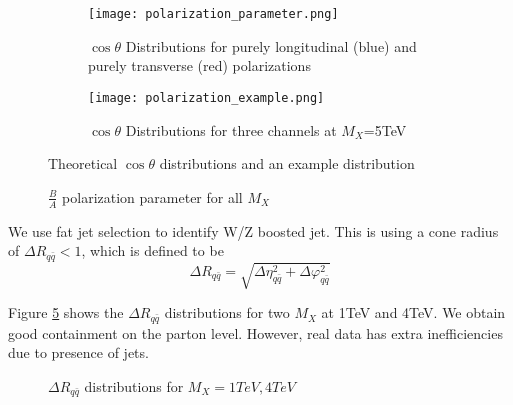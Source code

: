 \documentclass[12pt]{article}
\begin{document}
\begin{figure}
\centering
\begin{subfigure}{.4\textwidth}
  \centering
  \texttt{[image: polarization\_parameter.png]}
  \caption{$\cos\theta$ Distributions for purely longitudinal (blue) and purely transverse (red) polarizations}
  \label{polarization_parameter}
\end{subfigure}%
\begin{subfigure}{.6\textwidth}
  \centering
  \texttt{[image: polarization\_example.png]}
  \caption{$\cos\theta$ Distributions for three channels at $M_X$=5TeV}
  \label{polarization_example}
\end{subfigure}
\caption{Theoretical $\cos\theta$ distributions and an example distribution}
\label{qq_cuts}
\end{figure}

\begin{figure}[H]
\begin{center}
\caption[Caption for LOF]{$\frac{B}{A}$ polarization parameter for all $M_X$}
\label{ba}
\end{center}
\end{figure}
We use fat jet selection to identify W/Z boosted jet. This is using a cone radius of $\Delta R_{q\bar{q}}<1$, which is defined to be
\begin{equation}
\Delta R_{q\bar{q}}=\sqrt{\Delta\eta^2_{q\bar{q}}+\Delta\varphi^2_{q\bar{q}}}
\end{equation}


Figure \ref{delta_r} shows the $\Delta R_{q\bar{q}}$ distributions for two $M_X$ at 1TeV and 4TeV. We obtain good containment on the parton level. However, real data has extra inefficiencies due to presence of jets.
\begin{figure}[H]
\begin{center}
\caption[Caption for LOF]{$\Delta R_{q\bar{q}}$ distributions for $M_X=1TeV,4TeV$}
\label{delta_r}
\end{center}
\end{figure}
\end{document}
